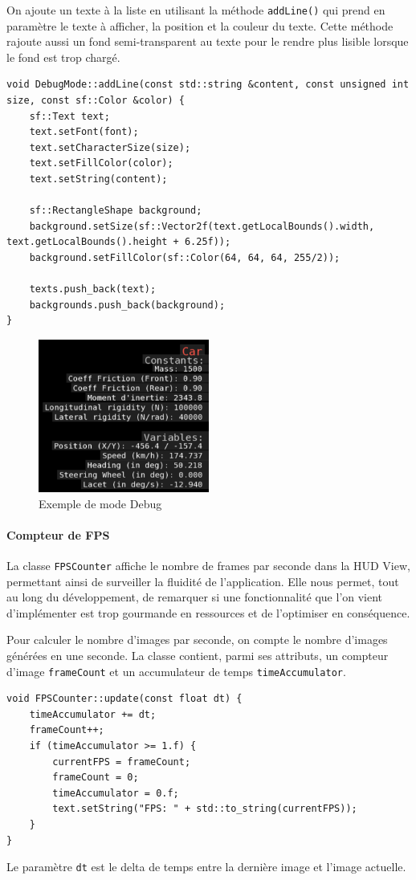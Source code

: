 On ajoute un texte à la liste en utilisant la méthode \texttt{addLine()} qui prend en paramètre le texte à afficher, la position et la couleur du texte.
Cette méthode rajoute aussi un fond semi-transparent au texte pour le rendre plus lisible lorsque le fond est trop chargé.

\begin{lstlisting}[style=CStyle, label={lst:code_addline}]
void DebugMode::addLine(const std::string &content, const unsigned int size, const sf::Color &color) {
    sf::Text text;
    text.setFont(font);
    text.setCharacterSize(size);
    text.setFillColor(color);
    text.setString(content);

    sf::RectangleShape background;
    background.setSize(sf::Vector2f(text.getLocalBounds().width, text.getLocalBounds().height + 6.25f));
    background.setFillColor(sf::Color(64, 64, 64, 255/2));

    texts.push_back(text);
    backgrounds.push_back(background);
}
\end{lstlisting}
\begin{figure}[H]
    \centering
    \includegraphics[width=0.5\textwidth]{resources/example_debug_mode_1}
    \caption{Exemple de mode Debug}
    \label{fig:debug_mode}
\end{figure}

\paragraph{Compteur de FPS}
La classe \texttt{FPSCounter} affiche le nombre de frames par seconde dans la HUD View, permettant ainsi de surveiller la fluidité de l'application.
Elle nous permet, tout au long du développement, de remarquer si une fonctionnalité que l'on vient d'implémenter est trop gourmande en ressources et de l'optimiser en conséquence.

Pour calculer le nombre d'images par seconde, on compte le nombre d'images générées en une seconde.
La classe contient, parmi ses attributs, un compteur d'image \texttt{frameCount} et un accumulateur de temps \texttt{timeAccumulator}.
\begin{lstlisting}[style=CStyle, label={lst:code_fpscounter}]
void FPSCounter::update(const float dt) {
    timeAccumulator += dt;
    frameCount++;
    if (timeAccumulator >= 1.f) {
        currentFPS = frameCount;
        frameCount = 0;
        timeAccumulator = 0.f;
        text.setString("FPS: " + std::to_string(currentFPS));
    }
}
\end{lstlisting}
Le paramètre \texttt{dt} est le delta de temps entre la dernière image et l'image actuelle.

